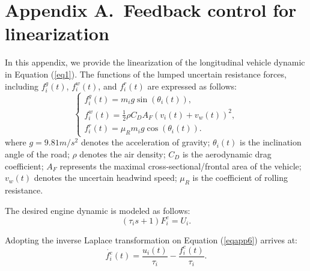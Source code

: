 \documentclass[journal]{IEEEtran}
\begin{document}
\section*{Appendix A.~Feedback control for linearization}
\label{AppendixA}
In this appendix, we provide the linearization of the longitudinal vehicle dynamic in Equation (\ref{eq1}). The functions of the lumped uncertain resistance forces, including $f_i^g(t)$, $f_i^w(t)$, and $f_i^r(t)$ are expressed as follows:
\begin{equation}
  \left\{\begin{array}{l}
    f_{i}^{g}(t)=m_{i} g \sin \left(\theta_{i}(t)\right),                        \\
    f_{i}^{w}(t)=\frac{1}{2} \rho C_{D} A_{F}\left(v_{i}(t)+v_{w}(t)\right)^{2}, \\
    f_{i}^{r}(t)=\mu_{R} m_{i} g \cos \left(\theta_{i}(t)\right).
  \end{array}\right.
  \label{eqapp5}
\end{equation}
where $g=9.81m/s^2$ denotes the acceleration of gravity; $\theta_i(t)$ is the inclination angle of the road; $\rho$ denotes the air density; $C_D$ is the aerodynamic drag coefficient; $A_F$ represents the maximal cross-sectional/frontal area of the vehicle; $v_w(t)$ denotes the uncertain headwind speed; $\mu_R$ is the coefficient of rolling resistance.

The desired engine dynamic is modeled as follows:
\begin{equation}
  (\tau_is+1)F_i^e=U_i.
  \label{eqapp6}
\end{equation}

Adopting the inverse Laplace transformation on Equation (\ref{eqapp6}) arrives at:
\begin{equation}
  \dot{f_i^e}\left(t\right)=\frac{u_i(t)}{\tau_i}-\frac{f_i^e\left(t\right)}{\tau_i}.
  \label{eqapp7}
\end{equation}
\end{document}

